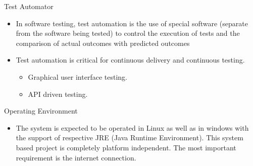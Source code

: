 \documentclass{beamer}
\begin{document}
\begin{frame}{Test Automator}
\begin{itemize}
\item  In software testing, test automation is the use of special software (separate from the
software being tested) to control the execution of tests and the comparison of actual outcomes with predicted outcomes
\vspace{0.5 cm}
\item Test automation is critical for continuous
delivery and continuous testing.
\vspace{0.5 cm}
\begin{itemize}
\item  Graphical user interface testing.
\item API driven testing.
\end{itemize}
\end{itemize}
\end{frame}

\begin{frame}{Operating Environment}
\begin{itemize}
\item The system is expected to be operated in Linux as well as in windows with the support of
respective JRE (Java Runtime Environment). This system based project is completely platform
independent. The most important requirement is the internet connection.
\end{itemize}
\end{frame}
\end{document}
